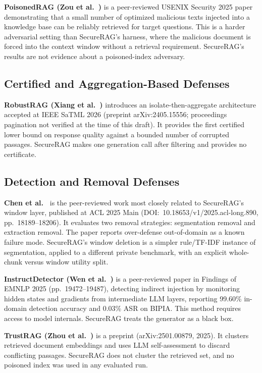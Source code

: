 \documentclass[journal]{IEEEtran}
\begin{document}
\textbf{PoisonedRAG (Zou et al.~\cite{zou2025poisonedrag})} is a peer-reviewed
USENIX Security 2025 paper demonstrating that a small number of optimized
malicious texts injected into a knowledge base can be reliably retrieved for
target questions. This is a harder adversarial setting than SecureRAG's harness,
where the malicious document is forced into the context window without a
retrieval requirement. SecureRAG's results are not evidence about a
poisoned-index adversary.

\subsection{Certified and Aggregation-Based Defenses}

\textbf{RobustRAG (Xiang et al.~\cite{xiang2026robustrag})} introduces an
isolate-then-aggregate architecture accepted at IEEE SaTML 2026
(preprint arXiv:2405.15556; proceedings pagination not verified at the time of
this draft). It provides the first certified lower bound on response quality
against a bounded number of corrupted passages. SecureRAG makes one generation
call after filtering and provides no certificate.

\subsection{Detection and Removal Defenses}

\textbf{Chen et al.~\cite{chen2025detecting}} is the peer-reviewed work most
closely related to SecureRAG's window layer, published at ACL 2025 Main
(DOI:~10.18653/v1/2025.acl-long.890, pp.~18189--18206). It evaluates two removal
strategies: segmentation removal and extraction removal. The paper reports
over-defense out-of-domain as a known failure mode. SecureRAG's window deletion
is a simpler rule/TF-IDF instance of segmentation, applied to a different private
benchmark, with an explicit whole-chunk versus window utility split.

\textbf{InstructDetector (Wen et al.~\cite{wen2025instructdetector})} is a
peer-reviewed paper in Findings of EMNLP 2025 (pp.~19472--19487), detecting
indirect injection by monitoring hidden states and gradients from intermediate
LLM layers, reporting 99.60\% in-domain detection accuracy and 0.03\% ASR on
BIPIA. This method requires access to model internals. SecureRAG treats the
generator as a black box.

\textbf{TrustRAG (Zhou et al.~\cite{zhou2025trustrag})} is a preprint
(arXiv:2501.00879, 2025). It clusters retrieved document embeddings and uses LLM
self-assessment to discard conflicting passages. SecureRAG does not cluster the
retrieved set, and no poisoned index was used in any evaluated run.
\end{document}
